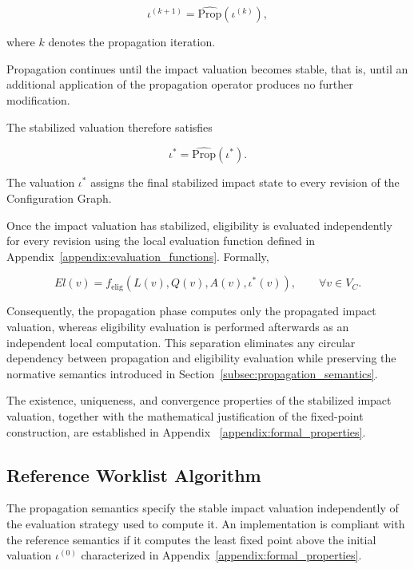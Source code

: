 \documentclass[10pt]{article}
\begin{document}
\begin{equation}
	\label{eq:impact_iteration}
	\iota^{(k+1)}
	=
	\widehat{\mathrm{Prop}}
	\!\left(
	\iota^{(k)}
	\right),
\end{equation}

where $k$ denotes the propagation iteration.

Propagation continues until the impact valuation becomes stable, that is, until an additional application of the propagation operator produces no further modification.

The stabilized valuation therefore satisfies

\begin{equation}
	\label{eq:impact_fixed_point}
	\iota^{*}
	=
	\widehat{\mathrm{Prop}}
	\!\left(
	\iota^{*}
	\right).
\end{equation}

The valuation $\iota^{*}$ assigns the final stabilized impact state to every
revision of the Configuration Graph.

Once the impact valuation has stabilized, eligibility is evaluated
independently for every revision using the local evaluation function defined in Appendix~\ref{appendix:evaluation_functions}. Formally,

\begin{equation}
	\label{eq:eligibility_after_propagation}
	El(v)
	=
	f_{\mathrm{elig}}
	\!\left(
	L(v),
	Q(v),
	A(v),
	\iota^{*}(v)
	\right),
	\qquad
	\forall v\in V_C.
\end{equation}

Consequently, the propagation phase computes only the propagated impact valuation, whereas eligibility evaluation is performed afterwards as an independent local computation. This separation eliminates any circular dependency between propagation and eligibility evaluation while preserving the normative semantics introduced in Section~\ref{subsec:propagation_semantics}.

The existence, uniqueness, and convergence properties of the stabilized impact valuation, together with the mathematical justification of the fixed-point construction, are established in Appendix ~\ref{appendix:formal_properties}.

\subsection{Reference Worklist Algorithm}
\label{appendix:ref_worklist_algo}
The propagation semantics specify the stable impact valuation independently of
the evaluation strategy used to compute it. An implementation is compliant with
the reference semantics if it computes the least fixed point above the initial
valuation $\iota^{(0)}$ characterized in
Appendix~\ref{appendix:formal_properties}.
\end{document}
